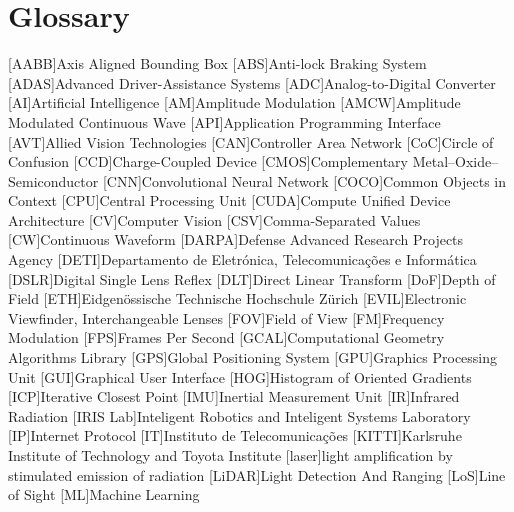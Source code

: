 \chapter{Glossary}

\footnotesize
\SingleSpacing

\begin{multicols}{2} 
\begin{acronym}[AAAAAA]
	[AABB]{Axis Aligned Bounding Box}
	[ABS]{Anti-lock Braking System}
	[ADAS]{Advanced Driver-Assistance Systems}
	[ADC]{Analog-to-Digital Converter}
	[AI]{Artificial Intelligence}
	[AM]{Amplitude Modulation}
	[AMCW]{Amplitude Modulated Continuous Wave}
	[API]{Application Programming Interface}
	[AVT]{Allied Vision Technologies}
	[CAN]{Controller Area Network} 
	[CoC]{Circle of Confusion}
	[CCD]{Charge-Coupled Device}
	[CMOS]{Complementary Metal–Oxide–Semiconductor}
	[CNN]{Convolutional Neural Network}
	[COCO]{Common Objects in Context}
	[CPU]{Central Processing Unit}
	[CUDA]{Compute Unified Device Architecture}
	[CV]{Computer Vision}
	[CSV]{Comma-Separated Values}
	[CW]{Continuous Waveform}
	[DARPA]{Defense Advanced Research Projects Agency}
	[DETI]{Departamento de Eletrónica, Telecomunicações e Informática}
	[DSLR]{Digital Single Lens Reflex}
	[DLT]{Direct Linear Transform}
	[DoF]{Depth of Field}
	[ETH]{Eidgenössische Technische Hochschule Zürich}
	[EVIL]{Electronic Viewfinder, Interchangeable Lenses}
	[FOV]{Field of View}
	[FM]{Frequency Modulation}
	[FPS]{Frames Per Second}
	[GCAL]{Computational Geometry Algorithms Library}
	[GPS]{Global Positioning System}
	[GPU]{Graphics Processing Unit}
	[GUI]{Graphical User Interface}
	[HOG]{Histogram of Oriented Gradients}
	[ICP]{Iterative Closest Point}
	[IMU]{Inertial Measurement Unit}
	[IR]{Infrared Radiation}
	[IRIS Lab]{Inteligent Robotics and Inteligent Systems Laboratory}
	[IP]{Internet Protocol}
	[IT]{Instituto de Telecomunicações}
	[KITTI]{Karlsruhe Institute of Technology and Toyota Institute}
	[laser]{light amplification by stimulated emission of radiation}
	[LiDAR]{Light Detection And Ranging}
	[LoS]{Line of Sight}
	[ML]{Machine Learning}

\end{acronym}
\end{multicols}
